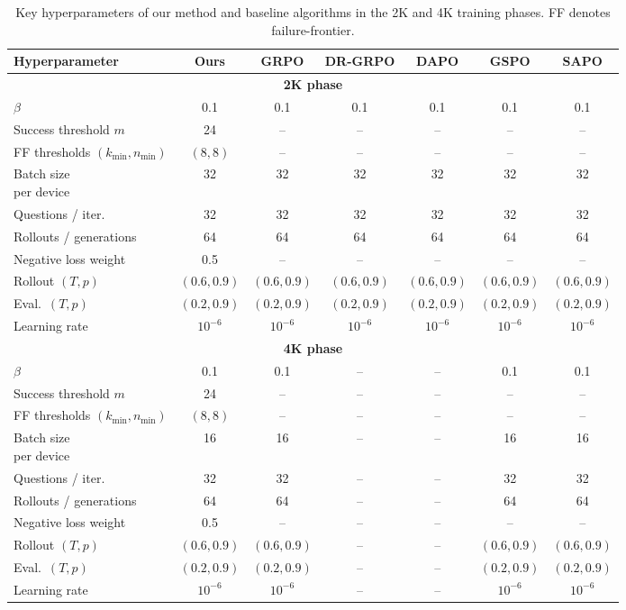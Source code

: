 \documentclass{article}
\begin{document}
\begin{table}[htbp]
\centering
\scriptsize
\setlength{\tabcolsep}{3.5pt}
\renewcommand{\arraystretch}{1.08}
\begin{tabular*}{\textwidth}{@{\extracolsep{\fill}}lcccccc}
\toprule
Hyperparameter & Ours & GRPO & DR-GRPO & DAPO & GSPO & SAPO \\
\midrule

\multicolumn{7}{c}{\textbf{2K phase}} \\
\midrule
$\beta$ & 0.1 & 0.1 & 0.1 & 0.1 & 0.1 & 0.1 \\
Success threshold $m$ & 24 & -- & -- & -- & -- & -- \\
FF thresholds $(k_{\min}, n_{\min})$ & $(8,8)$ & -- & -- & -- & -- & -- \\
\makecell[l]{Batch size \\ per device} & 32 & 32 & 32 & 32 & 32 & 32 \\
Questions / iter. & 32 & 32 & 32 & 32 & 32 & 32 \\
Rollouts / generations & 64 & 64 & 64 & 64 & 64 & 64 \\
Negative loss weight & 0.5 & -- & -- & -- & -- & -- \\
Rollout $(T,p)$ & $(0.6,0.9)$ & $(0.6,0.9)$ & $(0.6,0.9)$ & $(0.6,0.9)$ & $(0.6,0.9)$ & $(0.6,0.9)$ \\
Eval.\ $(T,p)$ & $(0.2,0.9)$ & $(0.2,0.9)$ & $(0.2,0.9)$ & $(0.2,0.9)$ & $(0.2,0.9)$ & $(0.2,0.9)$ \\
Learning rate & $10^{-6}$ & $10^{-6}$ & $10^{-6}$ & $10^{-6}$ & $10^{-6}$ & $10^{-6}$ \\

\midrule
\multicolumn{7}{c}{\textbf{4K phase}} \\
\midrule
$\beta$ & 0.1 & 0.1 & -- & -- & 0.1 & 0.1 \\
Success threshold $m$ & 24 & -- & -- & -- & -- & -- \\
FF thresholds $(k_{\min}, n_{\min})$ & $(8,8)$ & -- & -- & -- & -- & -- \\
\makecell[l]{Batch size \\ per device} & 16 & 16 & -- & -- & 16 & 16 \\
Questions / iter. & 32 & 32 & -- & -- & 32 & 32 \\
Rollouts / generations & 64 & 64 & -- & -- & 64 & 64 \\
Negative loss weight & 0.5 & -- & -- & -- & -- & -- \\
Rollout $(T,p)$ & $(0.6,0.9)$ & $(0.6,0.9)$ & -- & -- & $(0.6,0.9)$ & $(0.6,0.9)$ \\
Eval.\ $(T,p)$ & $(0.2,0.9)$ & $(0.2,0.9)$ & -- & -- & $(0.2,0.9)$ & $(0.2,0.9)$ \\
Learning rate & $10^{-6}$ & $10^{-6}$ & -- & -- & $10^{-6}$ & $10^{-6}$ \\

\bottomrule
\end{tabular*}
\caption{Key hyperparameters of our method and baseline algorithms in the 2K and 4K training phases. FF denotes failure-frontier.}
\label{tab:main_hparams_all}
\end{table}
\FloatBarrier
\end{document}
